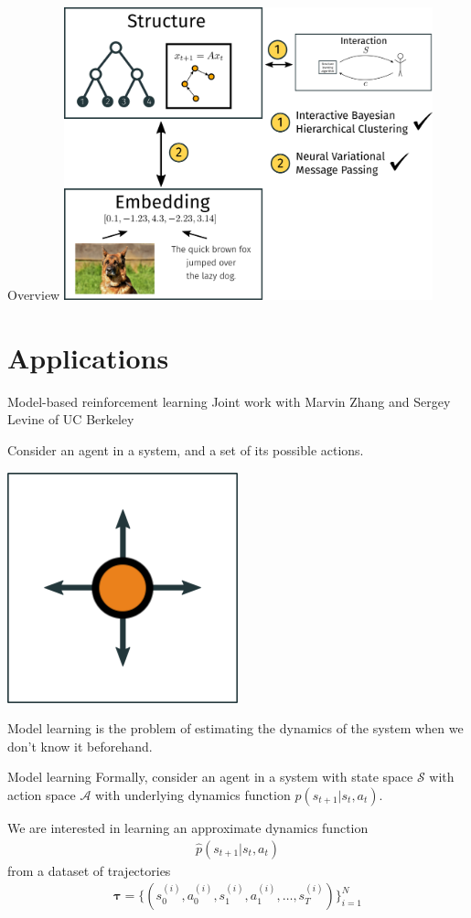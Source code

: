 \documentclass[10pt, compress]{beamer}
\begin{document}
\begin{frame}{Overview}
  \centering
  \includegraphics[width=0.8\textwidth]{img/overview-2}
\end{frame}

\section{Applications}

\begin{frame}{Model-based reinforcement learning}
    Joint work with Marvin Zhang and Sergey Levine of UC Berkeley
    \pause
    
	Consider an agent in a system,
	and a set of its possible actions.
	\begin{center}
		\includegraphics[width=0.5\textwidth]{img/agent-env-1.png}
	\end{center}
	\pause
	Model learning is the problem of estimating the dynamics of the system
	when we don't know it beforehand.
\end{frame}

\begin{frame}{Model learning}
	Formally, consider an agent in a system with state space $\mathcal{S}$
	with action space $\mathcal{A}$ with underlying dynamics 
	function $p(s_{t + 1} | s_t, a_t)$.

	We are interested in learning an approximate dynamics function
	\begin{align*}\hat{p}(s_{t + 1} | s_t, a_t)\end{align*}
		from a dataset of trajectories \begin{align*}\bm{\tau} = \{(s^{(i)}_0, a^{(i)}_0, s^{(i)}_1, a^{(i)}_1, \ldots, s^{(i)}_T)\}_{i = 1}^N\end{align*}
\end{frame}
\end{document}
